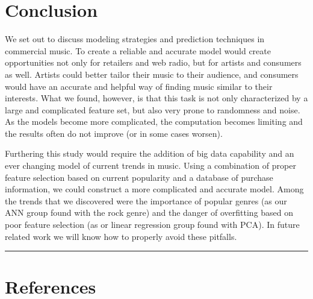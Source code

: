 \documentclass[12pt]{article}
\newcommand{\horizontalLine}{
	\begin{center}
		\hrule width 1.0\textwidth
	\end{center}
}
\begin{document}
\section{Conclusion}
\label{sec:conclusion}
We set out to discuss modeling strategies and prediction techniques in commercial music. To create a reliable and accurate model would create opportunities not only for retailers and web radio, but for artists and consumers as well. Artists could better tailor their music to their audience, and consumers would have an accurate and helpful way of finding music similar to their interests. What we found, however, is that this task is not only characterized by a large and complicated feature set, but also very prone to randomness and noise. As the models become more complicated, the computation becomes limiting and the results often do not improve (or in some cases worsen).

Furthering this study would require the addition of big data capability and an ever changing model of current trends in music. Using a combination of proper feature selection based on current popularity and a database of purchase information, we could construct a more complicated and accurate model. Among the trends that we discovered were the importance of popular genres (as our ANN group found with the rock genre) and the danger of overfitting based on poor feature selection (as or linear regression group found with PCA). In future related work we will know how to properly avoid these pitfalls.
\horizontalLine
\section{References}
\label{sec:references}
\end{document}

